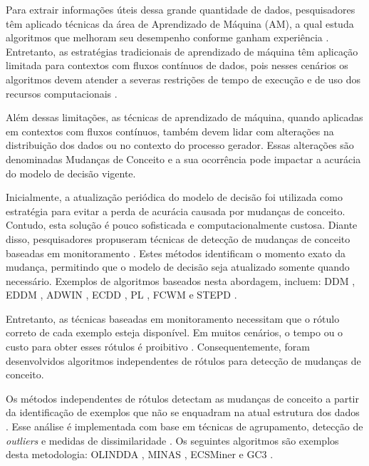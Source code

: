 \documentclass[qual, classic, a4paper]{ufbathesis}
\begin{document}
Para extrair informações úteis dessa grande quantidade de dados, 
pesquisadores têm aplicado técnicas da área de Aprendizado de Máquina (AM), 
a qual estuda algoritmos que melhoram seu desempenho conforme ganham experiência \cite{Mitchell:1997:ML:541177}.
%
Entretanto, as estratégias tradicionais de aprendizado de máquina têm aplicação limitada para contextos com fluxos contínuos de dados, 
pois nesses cenários os algoritmos devem atender a severas restrições de tempo de execução e de uso dos recursos computacionais \cite{bifet2009data}.

Além dessas limitações, 
as técnicas de aprendizado de máquina, 
quando aplicadas em contextos com fluxos contínuos, 
também devem lidar com alterações na distribuição dos dados ou no contexto do processo gerador.
%
Essas alterações são denominadas Mudanças de Conceito \cite{Gama:2010:KDD:1855075} e 
a sua ocorrência pode impactar a acurácia do modelo de decisão vigente.

Inicialmente, a atualização periódica do modelo de decisão foi utilizada como estratégia para evitar a perda de acurácia causada por mudanças de conceito.
%
Contudo, esta solução é pouco sofisticada e computacionalmente custosa.
% 
Diante disso, pesquisadores propuseram técnicas de detecção de mudanças de conceito baseadas em monitoramento \cite{Gama:2014:SCD:2597757.2523813}.
% 
Estes métodos identificam o momento exato da mudança, permitindo que o modelo de decisão seja atualizado somente quando necessário.
%
Exemplos de algoritmos baseados nesta abordagem, incluem: 
DDM \cite{GamaMCR04}, EDDM \cite{EDDM},  
ADWIN \cite{BifetG07}, ECDD \cite{Ross:2012:EWM:2076039.2076307}, 
PL \cite{Bach:PL:2008}, FCWM \cite{FCWM} e STEPD \cite{STEPD}.

Entretanto, as técnicas baseadas em monitoramento necessitam que o rótulo correto de cada exemplo esteja disponível.
%
Em muitos cenários, o tempo ou o custo para obter esses rótulos é proibitivo \cite{Aggarwal:2006:DSM:1196418}.
%
Consequentemente, foram desenvolvidos algoritmos independentes de rótulos para detecção de mudanças de conceito.

Os métodos independentes de rótulos detectam as mudanças de conceito a partir da identificação de exemplos que não se enquadram na atual estrutura dos dados \cite{Spinosa:2007:OCA:1244002.1244107}.
% 
Esse análise é implementada com base em técnicas de agrupamento, detecção de \textit{outliers} e medidas de dissimilaridade \cite{Ryu:Kantardzic:2012}.
%
Os seguintes algoritmos são exemplos desta metodologia:
OLINDDA \cite{Spinosa:2007:OCA:1244002.1244107},
MINAS \cite{Faria:2013:NDA:2480362.2480515},
ECSMiner \cite{Masud:2011:CNC:1978259.1978529} e 
GC3 \cite{Sethi2016b:GC3}.
\end{document}

